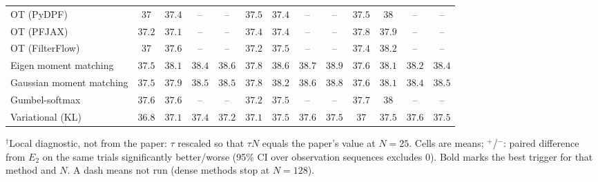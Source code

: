 \begin{table}[ht]
\begin{adjustbox}{max width=\linewidth}
\begin{tabular}{lcccc|cccc|cccc}
OT (PyDPF) & $37$ & $37.4$ & -- & -- & $37.5$ & $37.4$ & -- & -- & $37.5$ & $38$ & -- & -- \\
OT (PFJAX) & $37.2$ & $37.1$ & -- & -- & $37.4$ & $37.4$ & -- & -- & $37.8$ & $37.9$ & -- & -- \\
OT (FilterFlow) & $37$ & $37.6$ & -- & -- & $37.2$ & $37.5$ & -- & -- & $37.4$ & $38.2$ & -- & -- \\
Eigen moment matching & $37.5$ & $38.1$ & $38.4$ & $38.6$ & $37.8$ & $38.6$ & $38.7$ & $38.9$ & $37.6$ & $38.1$ & $38.2$ & $38.4$ \\
Gaussian moment matching & $37.5$ & $37.9$ & $38.5$ & $38.5$ & $37.8$ & $38.2$ & $38.6$ & $38.8$ & $37.6$ & $38.1$ & $38.4$ & $38.5$ \\
Gumbel-softmax & $37.6$ & $37.6$ & -- & -- & $37.2$ & $37.5$ & -- & -- & $37.7$ & $38$ & -- & -- \\
Variational (KL) & $36.8$ & $37.1$ & $37.4$ & $37.2$ & $37.1$ & $37.5$ & $37.6$ & $37.5$ & $37$ & $37.5$ & $37.6$ & $37.5$ \\
\bottomrule
\end{tabular}
\end{adjustbox}
\par\smallskip\parbox{0.95\linewidth}{\footnotesize $^\dagger$Local diagnostic, not from the paper: $\tau$ rescaled so that $\tau N$ equals the paper's value at $N{=}25$. Cells are means; $^{+}$/$^{-}$: paired difference from $E_2$ on the same trials significantly better/worse (95\% CI over observation sequences excludes 0). Bold marks the best trigger for that method and $N$. A dash means not run (dense methods stop at $N{=}128$).}
\end{table}

